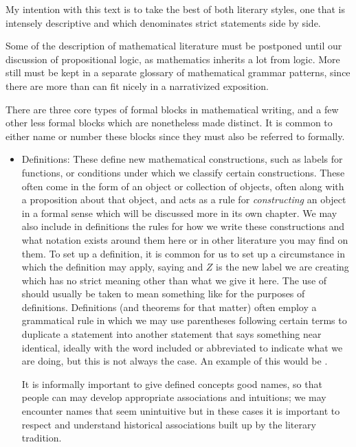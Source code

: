 \documentclass[11pt]{article}
\begin{document}
My intention with this text is to take the best of both literary styles, one that is intensely descriptive and which denominates strict statements side by side.

Some of the description of mathematical literature must be postponed until our discussion of propositional logic, as mathematics inherits a lot from logic. More still must be kept in a separate glossary of mathematical grammar patterns, since there are more than can fit nicely in a narrativized exposition.

There are three core types of formal blocks in mathematical writing, and a few other less formal blocks which are nonetheless made distinct. It is common to either name or number these blocks since they must also be referred to formally. \begin{itemize}
    \item Definitions: These define new mathematical constructions, such as labels for functions, or conditions under which we classify certain constructions. These often come in the form of an object or collection of objects, often along with a proposition about that object, and acts as a rule for \emph{constructing} an object in a formal sense which will be discussed more in its own chapter. We may also include in definitions the rules for how we write these constructions and what notation exists around them here or in other literature you may find on them. To set up a definition, it is common for us to set up a circumstance in which the definition may apply, saying  and $Z$ is the new label we are creating which has no strict meaning other than what we give it here. The use of  should usually be taken to mean something like  for the purposes of definitions. Definitions (and theorems for that matter) often employ a grammatical rule in which we may use parentheses following certain terms to duplicate a statement into another statement that says something near identical, ideally with the word  included or abbreviated to indicate what we are doing, but this is not always the case. An example of this would be .

    It is informally important to give defined concepts good names, so that people can may develop appropriate associations and intuitions; we may encounter names that seem unintuitive but in these cases it is important to respect and understand historical associations built up by the literary tradition.


\end{itemize}
\end{document}
